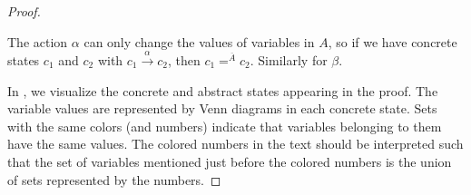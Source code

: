\documentclass[numbook]{svjour3}
\begin{document}
\begin{proof}
	\begin{observation}
		\label{por-observation2}
		The action $\alpha$ can only change the values of variables in $A$, so if we have concrete states $c_1$ and $c_2$ with $c_1 \xrightarrow{\alpha} c_2$, then $c_1 =^{\overline{A}} c_2$. Similarly for $\beta$.
	\end{observation}
	
	\newcommand{\cbox}[1]{%
		\def\bc{white}%
		\def\br{1.5pt}%
		\IfEqCase{#1}{%
			{0}{\def\bg{c0}\def\tc{black}\def\bc{lightborder}\def\br{0.5pt}}%
			{1}{\def\bg{c1}\def\tc{white}}%
			{2}{\def\bg{c2}\def\tc{black}}%
			{3}{\def\bg{c3}\def\tc{black}}%
			{4}{\def\bg{c4}\def\tc{black}}%
			{5}{\def\bg{c5}\def\tc{black}}%
			{6}{\def\bg{c6}\def\tc{black}}%
			{7}{\def\bg{c7}\def\tc{black}}%
			{8}{\def\bg{c8}\def\tc{white}}%
			{9}{\def\bg{c9}\def\tc{white}}%
			{10}{\def\bg{c10}\def\tc{black}}%
			{11}{\def\bg{c11}\def\tc{black}}%
			{12}{\def\bg{c12}\def\tc{white}}%
			{13}{\def\bg{c13}\def\tc{white}}%
			{14}{\def\bg{c14}\def\tc{black}}%
			{15}{\def\bg{c15}\def\tc{black}}%
			{16}{\def\bg{c16}\def\tc{black}}%
			{17}{\def\bg{c17}\def\tc{white}}%
			{18}{\def\bg{c18}\def\tc{black}}%
			{19}{\def\bg{c19}\def\tc{black}\def\bc{lightborder}\def\br{0.5pt}}%
		}%
		\tcbox[colback=\bg,fontupper=\color{\tc},colframe=\bc,boxrule=\br]{#1}%
	}%
	
	In , we visualize the concrete and abstract states appearing in the proof. The variable values are represented by Venn diagrams in each concrete state. Sets with the same colors (and numbers) indicate that variables belonging to them have the same values. The colored numbers in the text should be interpreted such that the set of variables mentioned just before the colored numbers is the union of sets represented by the numbers.
	

\end{proof}
\end{document}
